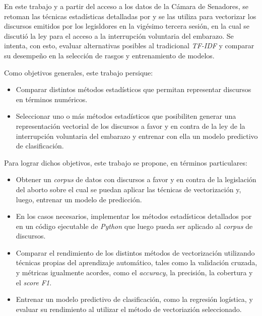 En este trabajo y a partir del acceso a los datos de la C\'amara de Senadores,
se retoman las t\'ecnicas estad\'isticas detalladas por
\citeauthor{monroe2008fightin} y se las utiliza para vectorizar los
discursos emitidos por los legisldores en la vig\'esimo tercera sesi\'on,
en la cual se discuti\'o la ley para el acceso a
la interrupci\'on voluntaria del embarazo.
Se intenta, con esto, evaluar alternativas posibles al tradicional \textit{TF-IDF}
y comparar su desempeño en la selecci\'on de rasgos y entrenamiento de modelos.

Como objetivos generales, este trabajo persique:

\begin{itemize}
    \item{Comparar distintos m\'etodos estad\'isticos que permitan representar
    discursos en t\'erminos num\'ericos.}
    \item{Seleccionar uno o m\'as m\'etodos estad\'isticos que posibiliten
    generar una representaci\'on vectorial de los discursos a favor y en
    contra de la ley de la interrupci\'on voluntaria del embarazo y entrenar
    con ella un modelo predictivo de clasificaci\'on.}
\end{itemize}

Para lograr dichos objetivos, este trabajo se propone, en t\'erminos
particulares:

\begin{itemize}
    \item{Obtener un \textit{corpus} de datos con discursos a favor y en contra
    de la legislaci\'on del aborto sobre el cual se puedan aplicar las t\'ecnicas de
    vectorizaci\'on y, luego, entrenar un modelo de predicci\'on.}
    \item{En los casos necesarios, implementar los m\'etodos estad\'isticos detallados
    por \cite{monroe2008fightin} en un c\'odigo ejecutable de \textit{Python} que
    luego pueda ser aplicado al \textit{corpus} de discursos.}
    \item{Comparar el rendimiento de los distintos m\'etodos de vectorizaci\'on utilizando
    t\'ecnicas propias del aprendizaje autom\'atico, tales como la validaci\'on
    cruzada, y m\'etricas igualmente acordes, como el \textit{accuracy}, la precisi\'on,
    la cobertura y el \textit{score F1}.}
    \item{Entrenar un modelo predictivo de clasificaci\'on, como la regresi\'on log\'istica,
    y evaluar su rendimiento al utilizar el m\'etodo de vectoriazi\'on seleccionado.}
\end{itemize}

